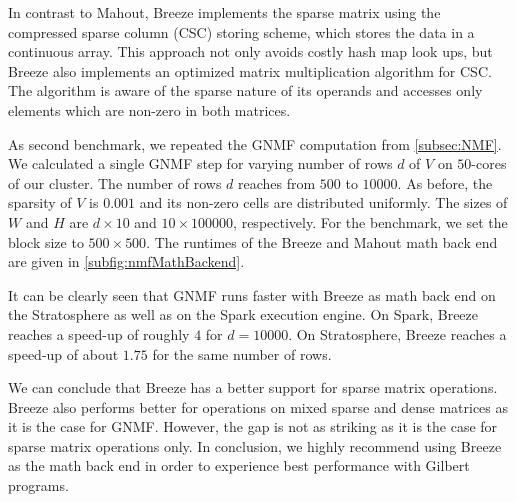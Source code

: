 In contrast to Mahout, Breeze implements the sparse matrix using the compressed sparse column (CSC) storing scheme, which stores the data in a continuous array.
This approach not only avoids costly hash map look ups, but Breeze also implements an optimized matrix multiplication algorithm for CSC.
The algorithm is aware of the sparse nature of its operands and accesses only elements which are non-zero in both matrices.

As second benchmark, we repeated the GNMF computation from \cref{subsec:NMF}.
We calculated a single GNMF step for varying number of rows $d$ of $V$ on $50$-cores of our cluster.
The number of rows $d$ reaches from $500$ to $10000$.
As before, the sparsity of $V$ is $0.001$ and its non-zero cells are distributed uniformly.
The sizes of $W$ and $H$ are $d\times 10$ and $10 \times 100000$, respectively.
For the benchmark, we set the block size to $500 \times 500$.
The runtimes of the Breeze and Mahout math back end are given in \cref{subfig:nmfMathBackend}.

It can be clearly seen that GNMF runs faster with Breeze as math back end on the Stratosphere as well as on the Spark execution engine.
On Spark, Breeze reaches a speed-up of roughly $4$ for $d=10000$. 
On Stratosphere, Breeze reaches a speed-up of about $1.75$ for the same number of rows.

We can conclude that Breeze has a better support for sparse matrix operations.
Breeze also performs better for operations on mixed sparse and dense matrices as it is the case for GNMF.
However, the gap is not as striking as it is the case for sparse matrix operations only.
In conclusion, we highly recommend using Breeze as the math back end in order to experience best performance with Gilbert programs.

